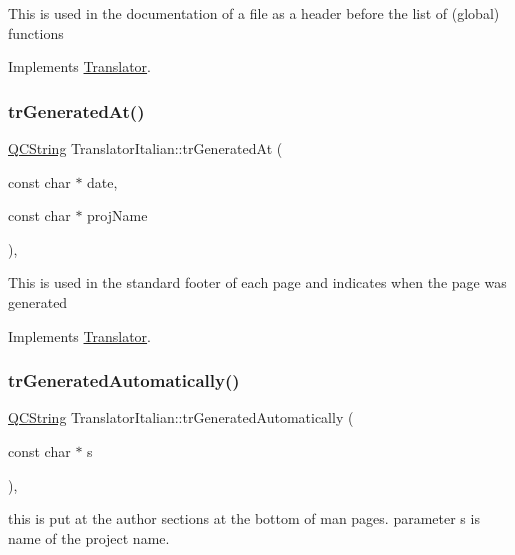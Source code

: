 This is used in the documentation of a file as a header before the list of (global) functions 

Implements \mbox{\hyperlink{class_translator}{Translator}}.

\mbox{\label{class_translator_italian_a61308d1ccf1b497c045d70605ab0673f}} 
\subsubsection{\texorpdfstring{trGeneratedAt()}{trGeneratedAt()}}
{\footnotesize\ttfamily \mbox{\hyperlink{class_q_c_string}{Q\+C\+String}} Translator\+Italian\+::tr\+Generated\+At (\begin{DoxyParamCaption}\item[{const char $\ast$}]{date,  }\item[{const char $\ast$}]{proj\+Name }\end{DoxyParamCaption})\hspace{0.3cm}{\ttfamily [inline]}, {\ttfamily [virtual]}}

This is used in the standard footer of each page and indicates when the page was generated 

Implements \mbox{\hyperlink{class_translator}{Translator}}.

\mbox{\label{class_translator_italian_ae6721e66d3e51c5e62f878b6540973eb}} 
\subsubsection{\texorpdfstring{trGeneratedAutomatically()}{trGeneratedAutomatically()}}
{\footnotesize\ttfamily \mbox{\hyperlink{class_q_c_string}{Q\+C\+String}} Translator\+Italian\+::tr\+Generated\+Automatically (\begin{DoxyParamCaption}\item[{const char $\ast$}]{s }\end{DoxyParamCaption})\hspace{0.3cm}{\ttfamily [inline]}, {\ttfamily [virtual]}}

this is put at the author sections at the bottom of man pages. parameter s is name of the project name. 

